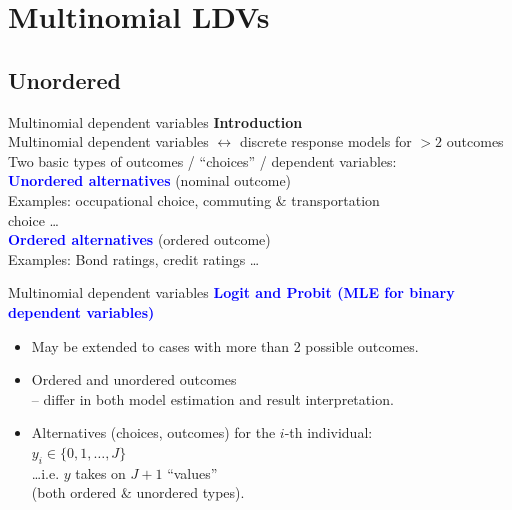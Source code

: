 \documentclass[usenames,dvipsnames]{beamer}
\begin{document}
\section{Multinomial LDVs}

\subsection{Unordered}

\begin{frame}{Multinomial dependent variables}
\textbf{Introduction} \\
\bigskip
Multinomial dependent variables $\leftrightarrow$ discrete response models for $ > 2$ outcomes\\
\medskip
Two basic types of outcomes / ``choices'' / dependent variables:\\
\bigskip
\textcolor{Blue}{\textbf{Unordered alternatives}} (nominal outcome) \\
\quad Examples: occupational choice, commuting \& transportation\\ \quad choice \dots \\
\medskip
\textcolor{Blue}{\textbf{Ordered alternatives}} (ordered outcome) \\
\quad Examples: Bond ratings, credit ratings \dots
\end{frame}
\begin{frame}{Multinomial dependent variables}
\textcolor{Blue}{\textbf{Logit and Probit (MLE for binary dependent variables)}}\\
\begin{itemize}
\item May be extended to cases with more than 2 possible outcomes. \\
\medskip
\item Ordered and unordered outcomes\\
– differ in both model estimation and result interpretation. \\
\vspace{0.8cm}
\item Alternatives (choices, outcomes) for the $i$-th individual: \\$y_i \in \{ 0,1, \dots, J \}$ \\
\vspace{0.3cm}
\dots \quad i.e. $y$ takes on $J+1$ ``values'' 
\\ \qquad (both ordered \& unordered types).
\end{itemize}
\end{frame}
\end{document}
